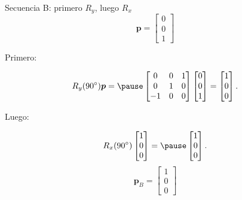 \documentclass[aspectratio=169,10pt]{beamer}
\begin{document}
\begin{frame}{Secuencia B: primero $R_y$, luego $R_x$}
    \small
    \[
    \boldsymbol{p}=\begin{bmatrix}0\\0\\1\end{bmatrix}
    \]

    Primero:

    \[
    R_y(90^\circ)\boldsymbol{p}
    =\pause
    \begin{bmatrix}
        0&0&1\\
        0&1&0\\
        -1&0&0
    \end{bmatrix}
    \begin{bmatrix}0\\0\\1\end{bmatrix}
    =
    \begin{bmatrix}1\\0\\0\end{bmatrix}.
    \]

    Luego:

    \[
    R_x(90^\circ)
    \begin{bmatrix}1\\0\\0\end{bmatrix}
    =\pause
    \begin{bmatrix}1\\0\\0\end{bmatrix}.
    \]
\vspace{0.2cm}
    \[
    \boxed{\boldsymbol{p}_B=\begin{bmatrix}1\\0\\0\end{bmatrix}}
    \]
\vspace{-0.2cm}
\pause
\end{frame}
\end{document}
